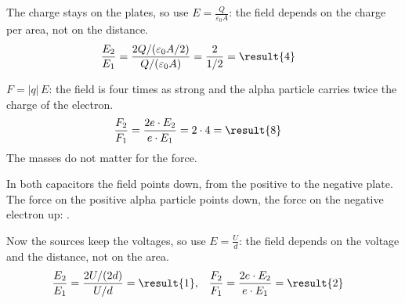\begin{abcliste}
\abc The charge stays on the plates, so use $E = \frac{Q}{\varepsilon_0 A}$: the field depends on the charge per area, not on the distance.
\begin{align}
 \frac{E_2}{E_1} &= \frac{2Q/(\varepsilon_0 A/2)}{Q/(\varepsilon_0 A)} = \frac{2}{1/2} = \result{4}
\end{align}

\abc $F = |q|\,E$: the field is four times as strong and the alpha particle carries twice the charge of the electron.
\begin{align}
 \frac{F_2}{F_1} &= \frac{2e\cdot E_2}{e\cdot E_1} = 2\cdot 4 = \result{8}
\end{align}
The masses do not matter for the force.

\abc In both capacitors the field points down, from the positive to the negative plate. The force on the positive alpha particle points down, the force on the negative electron up: .

\abc Now the sources keep the voltages, so use $E = \frac{U}{d}$: the field depends on the voltage and the distance, not on the area.
\begin{align}
 \frac{E_2}{E_1} &= \frac{2U/(2d)}{U/d} = \result{1}, &
 \frac{F_2}{F_1} &= \frac{2e\cdot E_2}{e\cdot E_1} = \result{2}
\end{align}
\end{abcliste}
